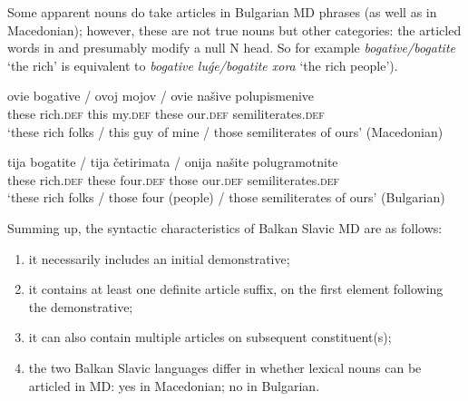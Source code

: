 \documentclass[output=paper,
colorlinks,
citecolor=brown,
newtxmath
]{langscibook}
\begin{document}
\noindent Some apparent nouns do take articles in Bulgarian MD phrases (as well as in Macedonian); however, these are not true nouns but other categories: the articled words in   and  presumably  modify a null N head. So for example \textit{bogative/bogatite} `the rich' is equivalent to \textit{bogative luǵe/bogatite xora} ‘the rich people’).


\ea \label{bogative}
\gll ovie bogative / ovoj mojov / ovie našive 	polupismenive \\
these rich.\textsc{def} { } this my.\textsc{def} { } these our.\textsc{def} semiliterates.\textsc{def} \\
\glt `these rich folks / this guy of mine / those semiliterates of ours'
\glt \hfill(Macedonian)
\z


\ea \label{bogatite}
\gll tija bogatite / tija četirimata / onija našite 	polugramotnite \\
these rich.\textsc{def} { } these four.\textsc{def} { } those our.\textsc{def} semiliterates.\textsc{def} \\
\glt `these rich folks / those four (people) / those semiliterates of ours'
\glt \hfill(Bulgarian)
\z

\noindent Summing up, the syntactic characteristics of Balkan Slavic MD are as follows:
\begin{enumerate}
\item it necessarily includes an initial demonstrative;
\item it  contains at least one definite article suffix, on the first element following the demonstrative;
\item it can also contain multiple articles on subsequent constituent(s);
\item the two Balkan Slavic languages differ in whether lexical nouns can be articled in MD: yes in Macedonian; no in Bulgarian.
\end{enumerate}
\end{document}
